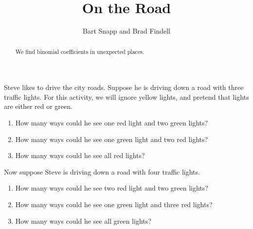 \documentclass[nooutcomes]{ximera}
\title{On the Road}
\author{Bart Snapp and Brad Findell}
\begin{document}
\begin{abstract}
  We find binomial coefficients in unexpected places.
\end{abstract}
\maketitle

\label{A:traffic}

\begin{problem} 
Steve likes to drive the city roads. Suppose he is driving down a road
with three traffic lights. For this activity, we will ignore yellow
lights, and pretend that lights are either red or green.
\begin{enumerate}
\item How many ways could he see one red light and two green lights?
\item How many ways could he see one green light and two red lights?
\item How many ways could he see all red lights?
\end{enumerate}
\end{problem}

\begin{problem} 
Now suppose Steve is driving down a road with four traffic lights.
\begin{enumerate}
\item How many ways could he see two red light and two green lights?
\item How many ways could he see one green light and three red lights?
\item How many ways could he see all green lights?
\end{enumerate}
\end{problem}
\end{document}
